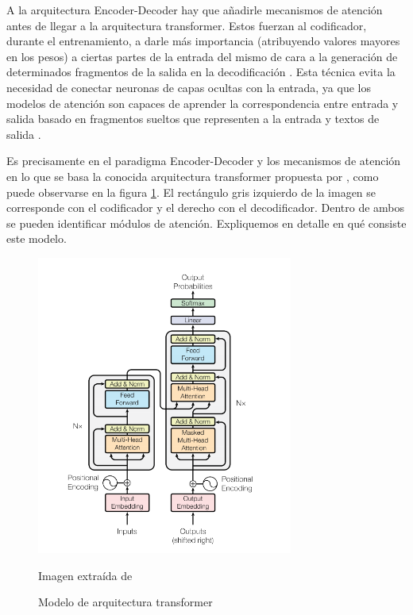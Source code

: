 A la arquitectura Encoder-Decoder hay que añadirle mecanismos de atención antes de llegar a la arquitectura transformer. Estos fuerzan al codificador, durante el entrenamiento, a darle más importancia (atribuyendo valores mayores en los pesos) a ciertas partes de la entrada del mismo de cara a la generación de determinados fragmentos de la salida en la decodificación \citep{tang2016context, xu2015show}. Esta técnica evita la necesidad de conectar neuronas de capas ocultas con la entrada, ya que los modelos de atención son capaces de aprender la correspondencia entre entrada y salida basado en fragmentos sueltos que representen a la entrada y textos de salida \citep{duvsek2016sequence}.

Es precisamente en el paradigma Encoder-Decoder y los mecanismos de atención en lo que se basa la conocida arquitectura transformer propuesta por \cite{transformers}, como puede observarse en la figura \ref{fig:transformer}. El rectángulo gris izquierdo de la imagen se corresponde con el codificador y el derecho con el decodificador. Dentro de ambos se pueden identificar módulos de atención. Expliquemos en detalle en qué consiste este modelo.

\begin{figure}[h]
	\centering%
	\centerline{\includegraphics[width = 0.75\textwidth]{Imagenes/Bitmap/transformer.png}}%
	\caption{Modelo de arquitectura transformer}%
	Imagen extraída de \cite{transformers}
	\label{fig:transformer}
\end{figure}


